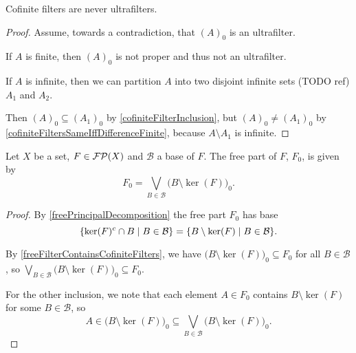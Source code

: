 \begin{lemma} \label{cofiniteFilterNotUltra}
Cofinite filters are never ultrafilters.
\end{lemma}
\begin{proof}
Assume, towards a contradiction, that $(A)_0$ is an ultrafilter.

If $A$ is finite, then $(A)_0$ is not proper and thus not an ultrafilter.

If $A$ is infinite, then we can partition $A$ into two disjoint infinite sets (TODO ref) $A_1$ and $A_2$.

Then $(A)_0 \subseteq (A_1)_0$ by \ref{cofiniteFilterInclusion}, but $(A)_0 \neq (A_1)_0$ by \ref{cofiniteFiltersSameIffDifferenceFinite}, because $A\setminus A_1$ is infinite.
\end{proof}

\begin{proposition} \label{cofiniteBaseFreePart}
Let $X$ be a set, $F\in \operatorname{\mathcal{FP}}(X)$ and $\mathcal{B}$ a base of $F$. The free part of $F$, $F_0$, is given by
\[ F_0 = \bigvee_{B\in\mathcal{B}}\big(B\setminus \ker(F)\big)_0. \]
\end{proposition}
\begin{proof}
By \ref{freePrincipalDecomposition} the free part $F_0$ has base
\[ \setbuilder{\ker(F)^c\cap B}{B\in \mathcal{B}} = \setbuilder{B\setminus \ker(F)}{B\in \mathcal{B}}. \]

By \ref{freeFilterContainsCofiniteFilters}, we have $\big(B\setminus \ker(F)\big)_0 \subseteq F_0$ for all $B\in\mathcal{B}$, so $\bigvee_{B\in\mathcal{B}}\big(B\setminus \ker(F)\big)_0 \subseteq F_0$.

For the other inclusion, we note that each element $A\in F_0$ contains $B\setminus\ker(F)$ for some $B\in\mathcal{B}$, so
\[ A\in \big(B\setminus\ker(F)\big)_0 \subseteq \bigvee_{B\in\mathcal{B}}\big(B\setminus \ker(F)\big)_0. \]
\end{proof}

